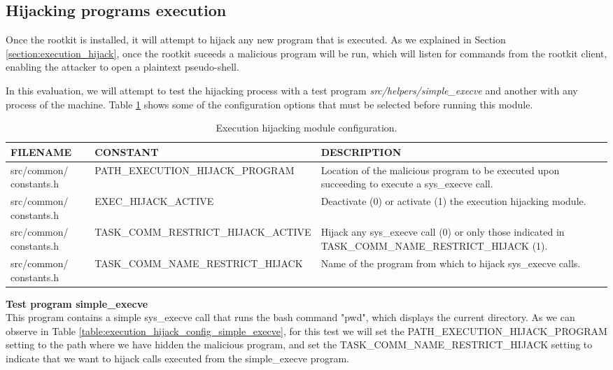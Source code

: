 \subsection{Hijacking programs execution}
Once the rootkit is installed, it will attempt to hijack any new program that is executed. As we explained in Section \ref{section:execution_hijack}, once the rootkit suceeds a malicious program will be run, which will listen for commands from the rootkit client, enabling the attacker to open a plaintext pseudo-shell. 

In this evaluation, we will attempt to test the hijacking process with a test program \textit{src/helpers/simple\_execve} and another with any process of the machine. Table \ref{table:execution_hijack_config} shows some of the configuration options that must be selected before running this module.

\begin{table}[htbp]
\begin{tabular}{|>{\centering\arraybackslash}p{3cm}|>{\centering\arraybackslash}p{4.5cm}|>{\centering\arraybackslash}p{6cm}|}
\hline
\textbf{FILENAME} & \textbf{CONSTANT} & \textbf{DESCRIPTION}\\
\hline
\hline
src/common/ constants.h & PATH\_EXECUTION\_HIJACK\_PROGRAM & Location of the malicious program to be executed upon succeeding to execute a sys\_execve call.\\
\hline
src/common/ constants.h & EXEC\_HIJACK\_ACTIVE & Deactivate (0) or activate (1) the execution hijacking module.\\
\hline
src/common/ constants.h & TASK\_COMM\_RESTRICT\_HIJACK\_ACTIVE  & Hijack any sys\_execve call (0) or only those indicated in TASK\_COMM\_NAME\_RESTRICT\_HIJACK (1).\\
\hline
src/common/ constants.h & TASK\_COMM\_NAME\_RESTRICT\_HIJACK & Name of the program from which to hijack sys\_execve calls.\\
\hline
\end{tabular}
\caption{Execution hijacking module configuration.}
\label{table:execution_hijack_config}
\end{table}


\textbf{Test program simple\_execve}\\
This program contains a simple sys\_execve call that runs the bash command "pwd", which displays the current directory. As we can observe in Table \ref{table:execution_hijack_config_simple_execve}, for this test we will set the PATH\_EXECUTION\_HIJACK\_PROGRAM setting to the path where we have hidden the malicious program, and set the TASK\_COMM\_NAME\_RESTRICT\_HIJACK setting to indicate that we want to hijack calls executed from the simple\_execve program.

